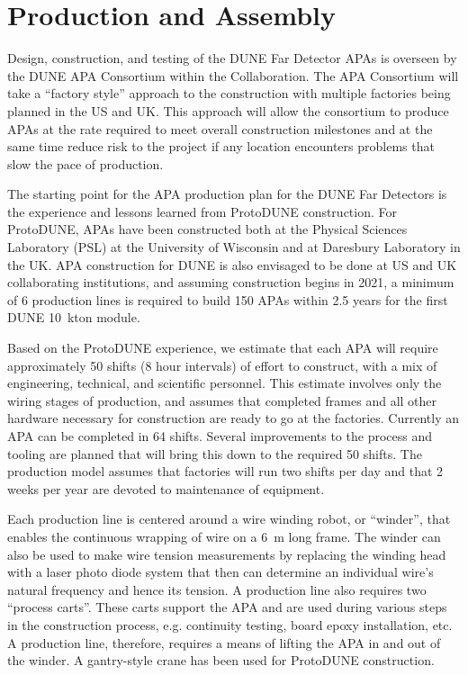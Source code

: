 \section{Production and Assembly}
\label{sec:fdsp-apa-prod-assy}

Design, construction, and testing of the DUNE Far Detector APAs is overseen by the DUNE APA Consortium within the Collaboration.  The APA Consortium will take a ``factory style'' approach to the construction with multiple factories being planned in the US and UK. This approach will allow the consortium to produce APAs at the rate required to meet overall construction milestones and at the same time reduce risk to the project if any location encounters problems that slow the pace of production.

The starting point for the APA production plan for the DUNE Far Detectors is the experience and lessons learned from ProtoDUNE construction. For ProtoDUNE, APAs have been constructed both at the Physical Sciences Laboratory (PSL) at the University of Wisconsin and at Daresbury Laboratory in the UK.  APA construction for DUNE is also envisaged to be done at US and UK collaborating institutions, and assuming construction begins in 2021, a minimum of 6 production lines is required to build 150 APAs within 2.5 years for the first DUNE \SI{10}{kton} module.   

Based on the ProtoDUNE experience, we estimate that each APA will require approximately 50 shifts (8 hour intervals) of effort to construct, with a mix of engineering, technical, and scientific personnel. This estimate involves only the wiring stages of production, and assumes that completed frames and all other hardware necessary for construction are ready to go at the factories. Currently an APA can be completed in 64 shifts. Several improvements to the process and tooling are planned that will bring this down to the required 50 shifts. The production model assumes that factories will run two shifts per day and that 2 weeks per year are devoted to maintenance of equipment. 

Each production line is centered around a wire winding robot, or ``winder'', that enables the continuous wrapping of wire on a \SI{6}{m} long frame. The winder can also be used to make wire tension measurements by replacing the winding head with a laser photo diode system that then can determine an individual wire's natural frequency and hence its tension. A production line also requires two ``process carts''. These carts support the APA and are used during various steps in the construction process, e.g. continuity testing, board epoxy installation, etc. A production line, therefore, requires a means of lifting the APA in and out of the winder. A gantry-style crane has been used for ProtoDUNE construction.

